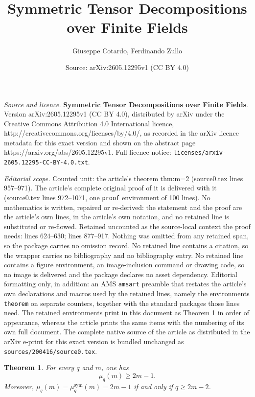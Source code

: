 \documentclass[10pt,a4paper]{amsart}
\title{\textbf{Symmetric Tensor Decompositions over Finite Fields}}
\author{Giuseppe Cotardo, Ferdinando Zullo}
\date{Source: arXiv:2605.12295v1 (CC BY 4.0)}
\newtheorem{theorem}{Theorem}
\begin{document}
\maketitle

\noindent\emph{Source and licence.} \textbf{Symmetric Tensor Decompositions over Finite Fields}. Version arXiv:2605.12295v1 (CC BY 4.0), distributed by arXiv under the Creative Commons Attribution 4.0 International licence, http://creativecommons.org/licenses/by/4.0/, as recorded in the arXiv licence metadata for this exact version and shown on the abstract page https://arxiv.org/abs/2605.12295v1. Full licence notice: \texttt{licenses/arxiv-2605.12295-CC-BY-4.0.txt}.\par\smallskip

\noindent\textit{Editorial scope.} Counted unit: the article's theorem thm:m=2 (source0.tex lines 957--971). The article's complete original proof of it is delivered with it (source0.tex lines 972--1071, one \texttt{proof} environment of 100 lines). No mathematics is written, repaired or re-derived: the statement and the proof are the article's own lines, in the article's own notation, and no retained line is substituted or re-flowed.  Retained uncounted as the source-local context the proof needs: lines 624--630; lines 877--917.  Nothing was omitted from any retained span, so the package carries no omission record.  No retained line contains a citation, so the wrapper carries no bibliography and no bibliography entry.  No retained line contains a figure environment, an image-inclusion command or drawing code, so no image is delivered and the package declares no asset dependency.  Editorial formatting only, in addition: an AMS \texttt{amsart} preamble that restates the article's own declarations and macros used by the retained lines, namely the environments \texttt{theorem} on separate counters, together with the standard packages those lines need.  The retained environments print in this document as Theorem 1 in order of appearance, whereas the article prints the same items with the numbering of its own full document.  The complete native source of the article as distributed in the arXiv e-print for this exact version is bundled unchanged as \texttt{sources/200416/source0.tex}.
\begin{theorem}\label{thm:burg}
For every \(q\) and \(m\), one has
\[
\mu_q(m)\geq 2m-1.
\]
Moreover, $\mu_q(m)=\mu_q^{\mathrm{sym}}(m)=2m-1$ if and only if \(q\geq 2m-2\).
\end{theorem}
\end{document}
